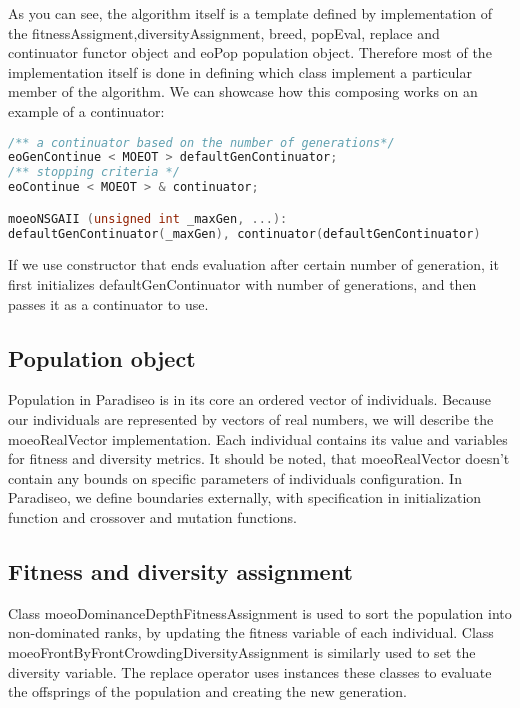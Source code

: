 \documentclass[12pt,oneside]{fithesis2}
\begin{document}
As you can see, the algorithm itself is a template defined by implementation of the fitnessAssigment,diversityAssignment, breed, popEval, replace and continuator functor object and eoPop population object. Therefore most of the implementation itself is done in defining which class implement a particular member of the algorithm. We can showcase how this composing works on an example of a continuator:

\begin{lstlisting}[language=C++,label=composition,caption=Object composition in Paradiseo]
/** a continuator based on the number of generations*/
eoGenContinue < MOEOT > defaultGenContinuator;
/** stopping criteria */
eoContinue < MOEOT > & continuator;

moeoNSGAII (unsigned int _maxGen, ...):
defaultGenContinuator(_maxGen), continuator(defaultGenContinuator)
\end{lstlisting}

If we use constructor that ends evaluation after certain number of generation, it first initializes defaultGenContinuator with number of generations, and then passes it as a continuator to use. 

\subsection{Population object}
Population in Paradiseo is in its core an ordered vector of individuals. Because our individuals are represented by vectors of real numbers, we will describe the moeoRealVector implementation. Each individual contains its value and variables for fitness and diversity metrics. It should be noted, that moeoRealVector doesn't contain any bounds on specific parameters of individuals configuration. In Paradiseo, we define boundaries externally, with specification in initialization function and crossover and mutation functions. 

\subsection{Fitness and diversity assignment}

Class moeoDominanceDepthFitnessAssignment is used to sort the population into non-dominated ranks, by updating the fitness variable of each individual. Class moeoFrontByFrontCrowdingDiversityAssignment is similarly used to set the diversity variable. The replace operator uses instances these classes to evaluate the offsprings of the population and creating the new generation.
\end{document}

